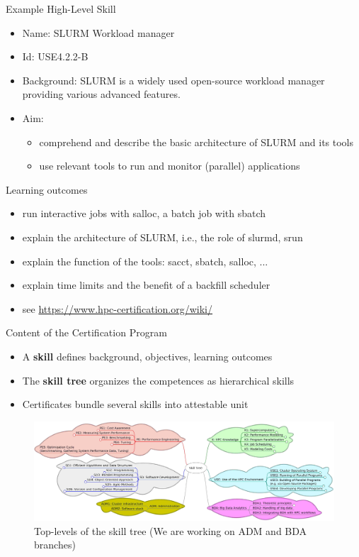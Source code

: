 \documentclass[compress,aspectratio=169]{beamer}
\begin{document}
\begin{frame}{Example High-Level Skill}

\begin{itemize}
\item Name: SLURM Workload manager
\item Id: USE4.2.2-B
\item Background: {\small SLURM is a widely used open-source workload
manager providing various advanced features.}
\item Aim:
\begin{itemize}
\item comprehend and describe the basic architecture of SLURM and its tools
\item use relevant tools to run and monitor (parallel) applications
\end{itemize}
\end{itemize}

\begin{block}{Learning outcomes}
\begin{itemize}
\item run interactive jobs with salloc, a batch job with sbatch
\item explain the architecture of SLURM, i.e., the role of slurmd, srun
\item explain the function of the tools: sacct, sbatch, salloc, ...
\item explain time limits and the benefit of a backfill scheduler
\item see \url{https://www.hpc-certification.org/wiki/}
\end{itemize}
\end{block}
\end{frame}


\begin{frame}{Content of the Certification Program}
	\begin{itemize}
		\item A \textbf{skill} defines background, objectives, learning outcomes
		\item The \textbf{skill tree} organizes the competences as hierarchical skills
		\item Certificates bundle several skills into attestable unit
	\end{itemize}

	\begin{figure}
		\includegraphics[width=\textwidth]{skill-tree}
		\vspace*{-2em}
		\caption{Top-levels of the skill tree (We are working on ADM and BDA branches)}
	\end{figure}
\end{frame}
\end{document}
